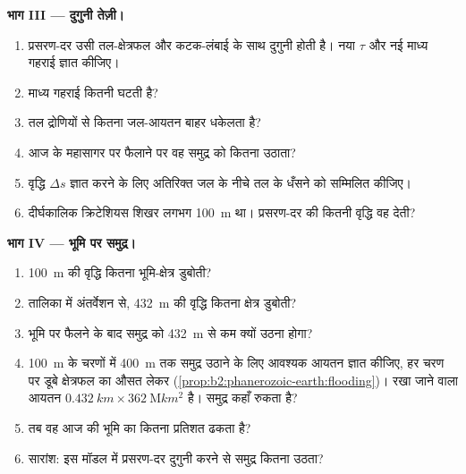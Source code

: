 \begin{problem}
\noindent\textbf{भाग III --- दुगुनी तेज़ी।}
\begin{enumerate}[resume]
  \item प्रसरण-दर उसी तल-क्षेत्रफल और कटक-लंबाई के साथ दुगुनी होती है। नया $\tau$
        और नई माध्य गहराई ज्ञात कीजिए।
  \item माध्य गहराई कितनी घटती है?
  \item तल द्रोणियों से कितना जल-आयतन बाहर धकेलता है?
  \item आज के महासागर पर फैलाने पर वह समुद्र को कितना उठाता?
  \item वृद्धि $\Delta s$ ज्ञात करने के लिए अतिरिक्त जल के नीचे तल के धँसने को सम्मिलित कीजिए।
  \item दीर्घकालिक क्रिटेशियस शिखर लगभग \qty{100}{m} था। प्रसरण-दर की कितनी वृद्धि
        वह देती?
\end{enumerate}

\noindent\textbf{भाग IV --- भूमि पर समुद्र।}
\begin{enumerate}[resume]
  \item \qty{100}{m} की वृद्धि कितना भूमि-क्षेत्र डुबोती?
  \item तालिका में अंतर्वेशन से, \qty{432}{m} की वृद्धि कितना क्षेत्र डुबोती?
  \item भूमि पर फैलने के बाद समुद्र को \qty{432}{m} से कम क्यों उठना होगा?
  \item \qty{100}{m} के चरणों में \qty{400}{m} तक समुद्र उठाने के लिए आवश्यक आयतन ज्ञात कीजिए,
        हर चरण पर डूबे क्षेत्रफल का औसत लेकर (\cref{prop:b2:phanerozoic-earth:flooding})।
        रखा जाने वाला आयतन $\qty{0.432}{km} \times \qty{362}{\mega km^2}$ है। समुद्र
        कहाँ रुकता है?
  \item तब वह आज की भूमि का कितना प्रतिशत ढकता है?
  \item सारांश: इस मॉडल में प्रसरण-दर दुगुनी करने से समुद्र कितना उठता?
\end{enumerate}
\end{problem}
